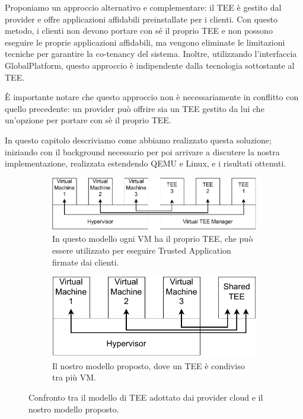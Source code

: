 \documentclass[12pt,italian]{report}
\begin{document}
Proponiamo un approccio alternativo e complementare: il TEE è gestito dal
provider e offre applicazioni affidabili preinstallate per i clienti.
Con questo metodo, i clienti non devono portare con sé il proprio TEE e
non possono eseguire le proprie applicazioni affidabili, ma vengono
eliminate le limitazioni tecniche per garantire la co-tenancy del sistema.
Inoltre, utilizzando l'interfaccia GlobalPlatform, questo approccio è
indipendente dalla tecnologia sottostante al TEE.

È importante notare che questo approccio non è necessariamente in conflitto
con quello precedente: un provider può offrire sia un TEE gestito da lui
che un'opzione per portare con sè il proprio TEE.

\bigbreak \noindent

In questo capitolo descriviamo come abbiamo realizzato questa soluzione;
iniziando con il background necessario per poi arrivare a discutere la nostra
implementazione, realizzata estendendo QEMU e Linux, e i risultati ottenuti.

\begin{figure}[h]
    \centering

    \begin{subfigure}{\columnwidth}
        \centering
        \includegraphics[width=0.8\linewidth]{immagini/common-cloud-tee-model}
        \caption{In questo modello ogni VM ha il proprio TEE, che può essere
            utilizzato per eseguire Trusted Application firmate dai clienti.}
        \label{fig:our-cloud-tee-model}
    \end{subfigure}

    \begin{subfigure}{\columnwidth}
        \centering
        \includegraphics[width=0.53\linewidth]{immagini/our-cloud-tee-model}
        \caption{Il nostro modello proposto, dove un TEE è condiviso tra più VM.}
        \label{fig:our-cloud-tee-model}
    \end{subfigure}
    \caption{
        Confronto tra il modello di TEE adottato dai provider cloud
        e il nostro modello proposto.
    }
\end{figure}
\end{document}
